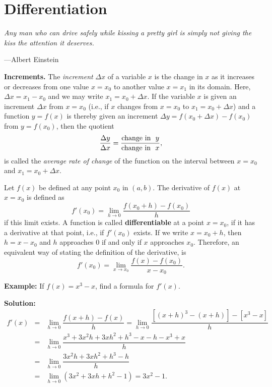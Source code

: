 \documentclass[titlepage,a4paper,12pt]{report}
\begin{document}
\chapter{Differentiation}
\begin{center}
	\small{\parbox{18cm}{
		\begin{raggedright}
		{\small
		\textit{Any man who can drive safely while kissing a pretty girl is simply not giving the kiss the attention it deserves.}
 }
 
				\vspace{.5cm}\hfill{---Albert Einstein }
		\end{raggedright}
	}
} 
\end{center}
\textbf{Increments.} The \textit{increment} $\Delta x$ of a variable $x$ is the change in $x$ as it increases or decreases from one value $x=x_0$ to another value $x=x_1$ in its domain. Here, $\Delta x=x_1-x_0$ and we may write $x_1=x_0+\Delta x$. If the variable $x$ is given an increment $\Delta x$ from $x=x_0$ (i.e., if $x$ changes from $x=x_0$ to $x_1=x_0+\Delta x$) and a function $y=f(x)$ is thereby given an increment $\Delta y=f(x_0+\Delta x)-f(x_0)$ from $y=f(x_0)$, then the quotient 
\begin{equation*}
\dfrac{\Delta y} {\Delta x}=\dfrac{\hbox{change in}~~ y}{\hbox{change in }~ x}, 
\end{equation*}
is called the \textit{average rate of change} of the function on the interval between $x=x_0$ and $x_1=x_0+\Delta x$.
 
\noindent Let $f(x)$ be defined at any point $x_0$ in $(a,b)$. The derivative of $f(x)$ at $x=x_0$ is defined as 
\begin{equation*}
f'(x_0)=\lim _{h\rightarrow 0}\dfrac{f(x_0+h)-f(x_0)}{h}
\end{equation*}
if this limit exists. A function is called \textbf{differentiable} at a point $x=x_0$, if it has a derivative at that point, i.e., if $f'(x_0)$ exists.  If we write $x=x_0+h$, then $h=x-x_0$ and $h$ approaches $0$ if and only if $x$ approaches $x_0$. Therefore, an equivalent way of stating the definition of the derivative, is 
\begin{equation*}
f'(x_0)=\lim _{x\rightarrow x_0} \dfrac{f(x)-f(x_0)}{x-x_0}.
\end{equation*}

\noindent \textbf{Example:} If $f(x)=x^3-x$, find a formula for $f'(x)$.

\noindent \textbf{Solution:} 
\begin{eqnarray*}
f'(x) &=& \lim _{h\rightarrow 0} \dfrac{f(x+h)-f(x)}{h} =\lim _{h\rightarrow 0}\dfrac{[(x+h)^3-(x+h)]-[x^3-x]}{h}\\
&=& \lim _{h\rightarrow 0} \dfrac{x^3+3x^2h+3xh^2+h^3-x-h-x^3+x}{h}\\
&=& \lim _{h\rightarrow 0} \dfrac{3x^2h+3xh^2+h^3-h}{h}\\
&=& \lim _{h\rightarrow 0} (3x^2+3xh+h^2-1) =3x^2-1.
\end{eqnarray*}
\end{document}
